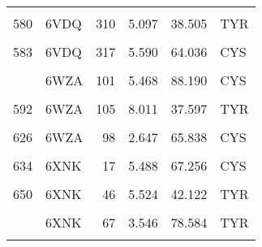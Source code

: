 \begin{table}
\begin{tabular}{llrrrl}
			\addlinespace
			\cellcolor{gray!6}{570} & \cellcolor{gray!6}{6VDQ} & \cellcolor{gray!6}{274} & \cellcolor{gray!6}{2.335} & \cellcolor{gray!6}{76.928} & \cellcolor{gray!6}{HIS}\\
			580 & 6VDQ & 310 & 5.097 & 38.505 & TYR\\
			\cellcolor{gray!6}{581} & \cellcolor{gray!6}{6VDQ} & \cellcolor{gray!6}{313} & \cellcolor{gray!6}{2.695} & \cellcolor{gray!6}{68.371} & \cellcolor{gray!6}{HIS}\\
			583 & 6VDQ & 317 & 5.590 & 64.036 & CYS\\
			\cellcolor{gray!6}{585} & \cellcolor{gray!6}{6VDQ} & \cellcolor{gray!6}{319} & \cellcolor{gray!6}{9.088} & \cellcolor{gray!6}{78.416} & \cellcolor{gray!6}{HIS}\\
			\addlinespace
			590 & 6WZA & 101 & 5.468 & 88.190 & CYS\\
			\cellcolor{gray!6}{591} & \cellcolor{gray!6}{6WZA} & \cellcolor{gray!6}{102} & \cellcolor{gray!6}{3.207} & \cellcolor{gray!6}{87.413} & \cellcolor{gray!6}{HIS}\\
			592 & 6WZA & 105 & 8.011 & 37.597 & TYR\\
			\cellcolor{gray!6}{612} & \cellcolor{gray!6}{6WZA} & \cellcolor{gray!6}{63} & \cellcolor{gray!6}{10.213} & \cellcolor{gray!6}{33.679} & \cellcolor{gray!6}{HIS}\\
			626 & 6WZA & 98 & 2.647 & 65.838 & CYS\\
			\addlinespace
			\cellcolor{gray!6}{631} & \cellcolor{gray!6}{6XNK} & \cellcolor{gray!6}{14} & \cellcolor{gray!6}{3.162} & \cellcolor{gray!6}{83.242} & \cellcolor{gray!6}{CYS}\\
			634 & 6XNK & 17 & 5.488 & 67.256 & CYS\\
			\cellcolor{gray!6}{635} & \cellcolor{gray!6}{6XNK} & \cellcolor{gray!6}{18} & \cellcolor{gray!6}{1.981} & \cellcolor{gray!6}{53.280} & \cellcolor{gray!6}{HIS}\\
			650 & 6XNK & 46 & 5.524 & 42.122 & TYR\\
			\cellcolor{gray!6}{652} & \cellcolor{gray!6}{6XNK} & \cellcolor{gray!6}{48} & \cellcolor{gray!6}{2.987} & \cellcolor{gray!6}{68.348} & \cellcolor{gray!6}{TYR}\\
			\addlinespace
			662 & 6XNK & 67 & 3.546 & 78.584 & TYR\\
			\cellcolor{gray!6}{665} & \cellcolor{gray!6}{6XNK} & \cellcolor{gray!6}{74} & \cellcolor{gray!6}{8.625} & \cellcolor{gray!6}{80.739} & \cellcolor{gray!6}{TYR}\\
			\bottomrule
		\end{tabular}
	\end{table}
	
